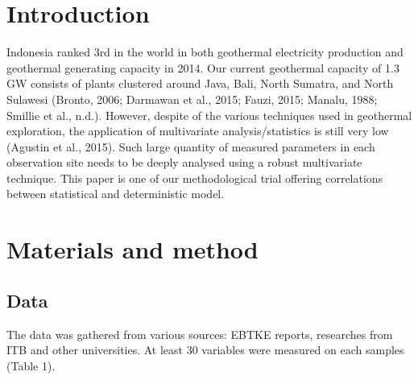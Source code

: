 \documentclass{sciposter}
\begin{document}
\begin{multicols}{3}

\begin{abstract}
The following paper is a try out on the application of multivariate analysis (regression tree, principal component analysis, and cluster analysis) for classifying hot water chemistry. The number of sample analysed was 416 from all over Indonesia. Regression tree technique has failed to read the data structure due to multi-collinearity effect therefore PCA and cluster analysis were applied.  We used open source R statistical packages to do the calculation. Such technique classifies hot water samples into three major clusters: cluster 1 (pure hot water), cluster 2 (mixing water), and cluster 3 (cold-meteoric water). Similar clustering were also detected in the PCA plot. The statistical is able to detect the close and open geothermal system based on data structure. This robust method should be applied to more geothermal system with larger dataset to see its performance. 

\end{abstract}

\section{Introduction}
Indonesia ranked 3rd in the world in both geothermal electricity production and geothermal generating capacity in 2014. Our current geothermal capacity of 1.3 GW consists of plants clustered around Java, Bali, North Sumatra, and North Sulawesi (Bronto, 2006; Darmawan et al., 2015; Fauzi, 2015; Manalu, 1988; Smillie et al., n.d.). However, despite of the various techniques used in geothermal exploration, the application of multivariate analysis/statistics is still very low (Agustin et al., 2015). Such large quantity of measured parameters in each observation site needs to be deeply analysed using a robust multivariate technique. This paper is one of our methodological trial offering correlations between statistical and deterministic model. 

\section{Materials and method}
\subsection{Data}
The data was gathered from various sources: EBTKE reports, researches from ITB and other universities. At least 30 variables were measured on each samples (Table 1).


\end{multicols}
\end{document}

